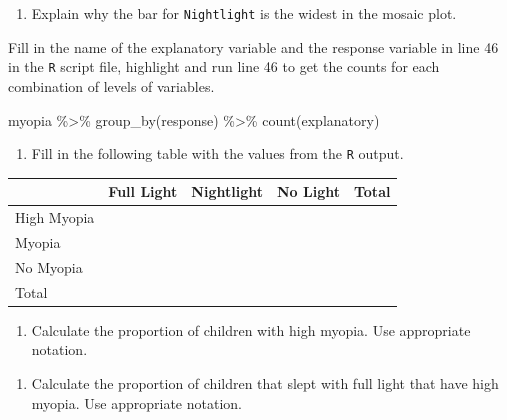 \documentclass[
]{report}
\newenvironment{Shaded}{\begin{snugshade}}{\end{snugshade}}
\newcommand{\FunctionTok}[1]{\textcolor[rgb]{0.00,0.00,0.00}{#1}}
\newcommand{\NormalTok}[1]{#1}
\newcommand{\SpecialCharTok}[1]{\textcolor[rgb]{0.00,0.00,0.00}{#1}}
\providecommand{\tightlist}{%
  \setlength{\itemsep}{0pt}\setlength{\parskip}{0pt}}
\begin{document}
\vspace{1in}

\begin{enumerate}
\def\labelenumi{\arabic{enumi}.}
\setcounter{enumi}{8}
\tightlist
\item
  Explain why the bar for \texttt{Nightlight} is the widest in the mosaic plot.
\end{enumerate}

\vspace{0.8in}

Fill in the name of the explanatory variable and the response variable in line 46 in the \texttt{R} script file, highlight and run line 46 to get the counts for each combination of levels of variables.

\begin{Shaded}
\begin{Highlighting}[]
\NormalTok{myopia }\SpecialCharTok{\%\textgreater{}\%} \FunctionTok{group\_by}\NormalTok{(response) }\SpecialCharTok{\%\textgreater{}\%} \FunctionTok{count}\NormalTok{(explanatory)}
\end{Highlighting}
\end{Shaded}

\begin{enumerate}
\def\labelenumi{\arabic{enumi}.}
\setcounter{enumi}{9}
\tightlist
\item
  Fill in the following table with the values from the \texttt{R} output.
\end{enumerate}

\begin{longtable}[]{@{}lllll@{}}
\toprule
& Full Light & Nightlight & No Light & Total \\
\midrule
\endhead
High Myopia & & & & \\
Myopia & & & & \\
No Myopia & & & & \\
Total & & & & \\
\bottomrule
\end{longtable}

\begin{enumerate}
\def\labelenumi{\arabic{enumi}.}
\setcounter{enumi}{10}
\tightlist
\item
  Calculate the proportion of children with high myopia. Use appropriate notation.
\end{enumerate}

\vspace{0.3in}

\begin{enumerate}
\def\labelenumi{\arabic{enumi}.}
\setcounter{enumi}{11}
\tightlist
\item
  Calculate the proportion of children that slept with full light that have high myopia. Use appropriate notation.
\end{enumerate}
\end{document}
